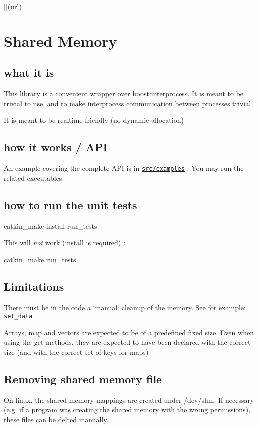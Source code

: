 \mbox{[}\mbox{]}(url)

\section*{Shared Memory}

\subsection*{what it is}


\begin{DoxyItemize}
\item This library is a convenient wrapper over boost\+:interprocess. It is meant to be trivial to use, and to make interprocess communication between processes trivial
\item It is meant to be realtime friendly (no dynamic allocation)
\end{DoxyItemize}

\subsection*{how it works / A\+PI}

An example covering the complete A\+PI is in \href{https://git-amd.tuebingen.mpg.de/amd-clmc/shared_memory/tree/master/src/examples}{\tt src/examples} . You may run the related executables.

\subsection*{how to run the unit tests}


\begin{DoxyCode}
catkin\_make install run\_tests
\end{DoxyCode}


This will {\itshape not} work (\textquotesingle{}install\textquotesingle{} is required) \+:


\begin{DoxyCode}
catkin\_make run\_tests
\end{DoxyCode}


\subsection*{Limitations}


\begin{DoxyItemize}
\item There must be in the code a \char`\"{}manual\char`\"{} cleanup of the memory. See for example\+: \href{https://git-amd.tuebingen.mpg.de/amd-clmc/shared_memory/blob/master/src/examples/set_data.cpp#L16}{\tt set\+\_\+data}
\item Arrays, map and vectors are expected to be of a predefined fixed size. Even when using the \textquotesingle{}get\textquotesingle{} methods, they are expected to have been declared with the correct size (and with the correct set of keys for maps)
\end{DoxyItemize}

\subsection*{Removing shared memory file}

On linux, the shared memory mappings are created under {\ttfamily /dev/shm}. If necessary (e.\+g. if a program was creating the shared memory with the wrong permissions), these files can be delted manually. 